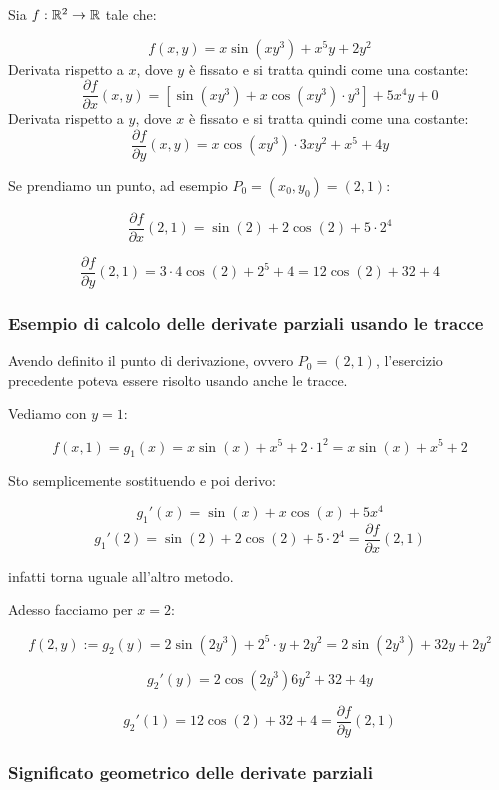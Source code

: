 Sia \(f: \mathbb{R}^2 \to \mathbb{R} \) tale che:

\[
    f(x,y) = x \sin(xy^{3})+x^{5}y+2y^{2}
\]
Derivata rispetto a \(x\), dove \(y\) è fissato e si tratta quindi come una costante:
\[
    \frac{\partial f}{\partial x}(x,y) = \left[ \sin(xy^{3}) + x \cos(xy^{3}) \cdot y^{3} \right] + 5x^{4}y + 0
\]
Derivata rispetto a \(y\), dove \(x\) è fissato e si tratta quindi come una costante:
\[
    \frac{\partial f}{\partial y}(x,y) = x \cos(xy^{3}) \cdot 3xy^{2}+x^{5}+4y
\]

Se prendiamo un punto, ad esempio \(P_0 = (x_0,y_0) = (2,1) \):

\[
    \frac{\partial f}{\partial x}(2,1) = \sin(2) + 2 \cos(2) + 5\cdot 2^{4}
\]

\[
    \frac{\partial f}{\partial y}(2,1) = 3\cdot 4 \cos(2) + 2^{5}+4 = 12 \cos(2) +32 + 4
\]

\subsubsection*{Esempio di calcolo delle derivate parziali usando le tracce}

Avendo definito il punto di derivazione, ovvero \(P_0 = (2,1)\), l'esercizio precedente poteva essere risolto usando anche le tracce.

Vediamo con \(y=1\):

\[
    f(x,1) = g_1(x) = x \sin(x) + x^{5}+2 \cdot 1^{2} = x \sin(x) + x^{5}+2
\]

Sto semplicemente sostituendo e poi derivo:

\[
    g_1'(x) = \sin(x) + x \cos(x) + 5x^{4}
\]
\[
    g_1'(2) = \sin(2) + 2 \cos(2) + 5 \cdot 2^{4} = \frac{\partial f}{\partial x}(2,1)
\]

infatti torna uguale all'altro metodo.

Adesso facciamo per \(x=2\):

\[
    f(2,y) := g_2(y) = 2 \sin(2y^{3}) + 2^{5} \cdot y + 2y^{2} = 2 \sin(2y^{3}) + 32y + 2y^{2}
\]

\[
    g_2'(y) = 2 \cos(2y^{3}) 6y^{2} + 32 + 4y
\]

\[
    g_2'(1) = 12 \cos(2) + 32 + 4 = \frac{\partial f}{\partial y}(2,1)
\]

\filbreak{}
\subsubsection{Significato geometrico delle derivate parziali}

